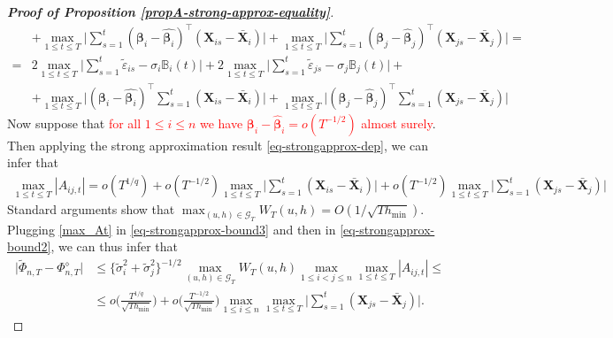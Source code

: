 \documentclass[a4paper,12pt]{article}
\begin{document}
\begin{proof}[\textnormal{\textbf{Proof of Proposition \ref{propA-strong-approx-equality}}}]
\begin{align*}
& + \max_{1 \le t \le T} \Big|\sum\limits_{s=1}^t(\bm{\beta}_i - \widehat{\bm{\beta}_i})^\top (\mathbf{X}_{is} - \bar{\mathbf{X}}_{i}) \Big| 
+ \max_{1 \le t \le T} \Big|\sum\limits_{s=1}^t(\bm{\beta}_j - \widehat{\bm{\beta}}_j)^\top (\mathbf{X}_{js} - \bar{\mathbf{X}}_{j}) \Big| =\\
= & 2 \max_{1 \le t \le T} \Big| \sum\limits_{s=1}^t \widetilde{\varepsilon}_{is} - \sigma_i \mathbb{B}_{i}(t) \Big| + 2 \max_{1 \le t \le T} \Big| \sum\limits_{s=1}^t \widetilde{\varepsilon}_{js} - \sigma_j \mathbb{B}_{j}(t) \Big| +\\
& + \max_{1 \le t \le T} \Big|(\bm{\beta}_i - \widehat{\bm{\beta}_i})^\top\sum\limits_{s=1}^t (\mathbf{X}_{is} - \bar{\mathbf{X}}_{i}) \Big| 
+ \max_{1 \le t \le T} \Big|(\bm{\beta}_j - \widehat{\bm{\beta}}_j)^\top\sum\limits_{s=1}^t (\mathbf{X}_{js} - \bar{\mathbf{X}}_{j}) \Big|
\end{align*}
Now suppose that \textcolor{red}{for all $1 \le i \le n$ we have $\bm{\beta}_i - \widehat{\bm{\beta}}_i = o(T^{-1/2})$ almost surely}. Then applying the strong approximation result \eqref{eq-strongapprox-dep}, we can infer that
\begin{align}\label{max_At}
\max_{1 \le t \le T} |A_{ij, t}|  = o(T^{1/q}) + o(T^{-1/2})\max_{1 \le t \le T}\Big|\sum\limits_{s=1}^t (\mathbf{X}_{is} - \bar{\mathbf{X}}_{i})\Big| +  o(T^{-1/2})\max_{1 \le t \le T}\Big|\sum\limits_{s=1}^t (\mathbf{X}_{js} - \bar{\mathbf{X}}_{j} )\Big|
\end{align}
Standard arguments show that $\max_{(u,h) \in \mathcal{G}_T} W_T(u,h) = O( 1/\sqrt{Th_{\min}} )$. Plugging \eqref{max_At} in \eqref{eq-strongapprox-bound3} and then in \eqref{eq-strongapprox-bound2}, we can thus infer that 
\begin{align}\label{eq-strongapprox-bound4}
\big| \widetilde{\Phi}_{n, T} - \Phi_{n, T}^{\diamond} \big| &\le \{\widetilde{\sigma}_i^2 + \widetilde{\sigma}_j^2 \}^{-1/2}  \max_{(u,h) \in \mathcal{G}_T} W_T(u, h) \max_{1\le i < j \le n}\max_{1\le t \le T} |A_{ij, t}|\le\nonumber \\
&\le o \Big( \frac{T^{1/q}}{\sqrt{Th_{\min}}} \Big) + o \Big( \frac{T^{-1/2}}{\sqrt{Th_{\min}}} \Big)\max_{1 \le i \le n}\max_{1\le t \le T}\Big|\sum\limits_{s=1}^t (\mathbf{X}_{js} - \bar{\mathbf{X}}_{j} )\Big|.
\end{align}


\end{proof}
\end{document}
